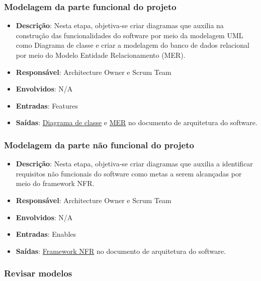\subsubsection{Modelagem da parte funcional do projeto}

\begin{itemize}
  \item \textbf{Descrição}: Nesta etapa, objetiva-se criar diagramas que auxilia na construção das funcionalidades do software por meio da modelagem UML como Diagrama de classe e criar a modelagem do banco de dados relacional por meio do Modelo Entidade Relacionamento (MER).
  \item \textbf{Responsável}: Architecture Owner e Scrum Team
  \item \textbf{Envolvidos}: N/A
  \item \textbf{Entradas}: Features
  \item \textbf{Saídas}: \href{https://victorarnaud.github.io/TBL/contribuicao/arquitetura/#3-diagrama-de-classe}{Diagrama de classe} e \href{https://victorarnaud.github.io/TBL/contribuicao/arquitetura/#3-diagrama-de-classe}{MER} no documento de arquitetura do software.
\end{itemize}

\subsubsection{Modelagem da parte não funcional do projeto}

\begin{itemize}
  \item \textbf{Descrição}: Nesta etapa, objetiva-se criar diagramas que auxilia a identificar requisitos não funcionais do software como metas a serem alcançadas por meio do framework NFR.
  \item \textbf{Responsável}: Architecture Owner e Scrum Team
  \item \textbf{Envolvidos}: N/A
  \item \textbf{Entradas}: Enables
  \item \textbf{Saídas}: \href{https://victorarnaud.github.io/TBL/contribuicao/arquitetura/#5-framework-nfr}{Framework NFR} no documento de arquitetura do software.
\end{itemize}

\subsubsection{Revisar modelos}


